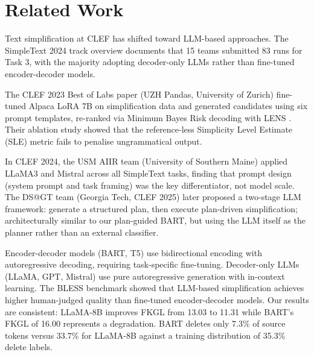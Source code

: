 \documentclass{ceurart}
\begin{document}
\section{Related Work}

Text simplification at CLEF has shifted toward LLM-based approaches.
The SimpleText 2024 track overview \cite{ermakova2024simpletext} documents that 15 teams submitted 83 runs for Task 3, with the majority adopting decoder-only LLMs rather than fine-tuned encoder-decoder models.

The CLEF 2023 Best of Labs paper \cite{michail2024simpletext} (UZH Pandas, University of Zurich) fine-tuned Alpaca LoRA 7B on simplification data and generated candidates using six prompt templates, re-ranked via Minimum Bayes Risk decoding with LENS \cite{maddela2023lens}.
Their ablation study showed that the reference-less Simplicity Level Estimate (SLE) metric fails to penalise ungrammatical output.

In CLEF 2024, the USM AIIR team \cite{largey2024simpletext} (University of Southern Maine) applied LLaMA3 and Mistral across all SimpleText tasks, finding that prompt design (system prompt and task framing) was the key differentiator, not model scale.
The DS@GT team \cite{marturi2025simpletext} (Georgia Tech, CLEF 2025) later proposed a two-stage LLM framework: generate a structured plan, then execute plan-driven simplification; architecturally similar to our plan-guided BART, but using the LLM itself as the planner rather than an external classifier.

Encoder-decoder models \cite{nielsen2024encoder} (BART, T5) use bidirectional encoding with autoregressive decoding, requiring task-specific fine-tuning.
Decoder-only LLMs (LLaMA, GPT, Mistral) use pure autoregressive generation with in-context learning.
The BLESS benchmark \cite{kew2023bless} showed that LLM-based simplification achieves higher human-judged quality than fine-tuned encoder-decoder models.
Our results are consistent: LLaMA-8B improves FKGL from 13.03 to 11.31 while BART's FKGL of 16.00 represents a degradation.
BART deletes only 7.3\% of source tokens versus 33.7\% for LLaMA-8B against a training distribution of 35.3\% delete labels.

\end{document}

